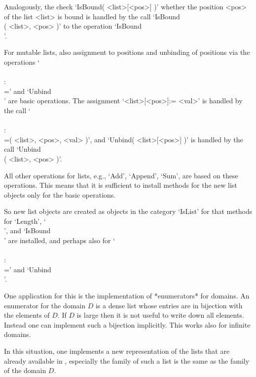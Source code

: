 Analogously, the check `IsBound( <list>[<pos>] )' whether the position
<pos> of the list <list> is bound is handled by the call
`IsBound\\[\\]( <list>, <pos> )' to the operation
`IsBound\\[\\]'.

For mutable lists, also assignment to positions and unbinding of
positions via the operations `\\[\\]\\:\\=' and `Unbind\\[\\]'
are basic operations.
The assignment `<list>[<pos>]:= <val>' is handled by the call
`\\[\\]\\:\\=( <list>, <pos>, <val> )',
and `Unbind( <list>[<pos>] )' is handled by the call
`Unbind\\[\\]( <list>, <pos> )'.

All other operations for lists, e.g., `Add', `Append', `Sum',
are based on these operations.
This means that it is sufficient to install methods for the new list
objects only for the basic operations.

So new list objects are created as objects in the category `IsList'
for that methods for `Length', `\\[\\]', and `IsBound\\[\\]' are
installed,
and perhaps also for `\\[\\]\\:\\=' and `Unbind\\[\\]'.

One application for this is the implementation of *enumerators*
for domains.
An enumerator for the domain $D$ is a dense list whose entries are
in bijection with the elements of $D$.
If $D$ is large then it is not useful to write down all elements.
Instead one can implement such a bijection implicitly.
This works also for infinite domains.

In this situation, one implements a new representation of the
lists that are already available in {\GAP},
especially the family of such a list is the same as the family of
the domain $D$.

